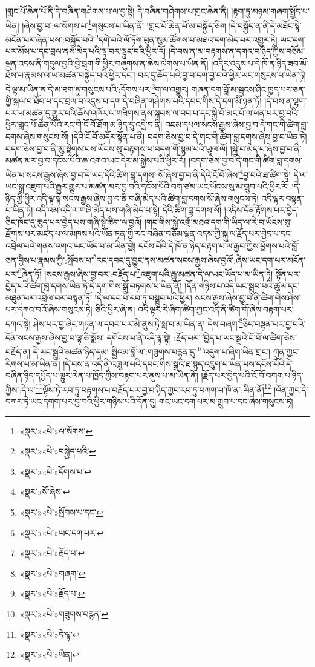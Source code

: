 །གླང་པོ་ཆེན་པོ་ནི་དེ་བཞིན་གཤེགས་པ་ལ་བྱ་སྟེ། དེ་བཞིན་གཤེགས་པ་གླང་ཆེན་ནི། །རྟག་ཏུ་མཉམ་གཞག་སྤྱོད་པ་ཡིན། །ཞེས་བྱ་བ་:ལ་སོགས་པ་\footnote{«སྣར་»«པེ་»ལ་སོགས་}གསུངས་པ་ཡིན་ནོ། །གླང་པོ་ཆེན་པོ་མ་བསྐྱོད་ཅིག །དེ་བསྐྱོད་ན་ནི་དེ་མཐོང་སྟེ་མངོན་པར་ཞེན་པས་:བསྐྱོད་པའི་\footnote{«སྣར་»«པེ་»བསྐྱེད་པའི་}དགེ་བའི་ལོ་ཏོག་ཕུན་སུམ་ཚོགས་པ་མཐའ་དག་མེད་པར་འགྱུར་ཏེ། ཡང་དག་པར་མོས་པ་དང་བྲལ་ནས་མེད་པའི་ལྟ་བར་ལྟུང་བའི་ཕྱིར་རོ། །དེ་བས་ན་མ་བརྟགས་ན་དགའ་བ་ཉིད་ཀྱིས་བཅོམ་ལྡན་འདས་ནི་གདུལ་བྱའི་བྱེ་བྲག་གི་ཕྱིར་བཞུགས་ན་ཆེས་ལེགས་པ་ཡིན་ནོ། །འདིར་འདུས་པ་དེ་ཁོ་ན་ཉིད་ཟབ་མོ་ཐོས་པ་རྣམས་ལ་ཡ་མཚན་བསྐྱེད་པའི་ཕྱིར་དང་། བར་དུ་ཆོད་པའི་བྱ་བ་དག་བྱ་བའི་ཕྱིར་ཡང་གསུངས་པ་ཡིན་ཏེ། དེ་ལྟ་མ་ཡིན་ན་དེ་མ་ཐག་ཏུ་གསུངས་པའི་:དོགས་པར་\footnote{«སྣར་»«པེ་»དོགས་པ་}ག་ལ་འགྱུར། གཞན་དག་བློ་མ་སྦྱངས་ཤིང་ཁྱད་པར་ཅན་གྱི་སྐལ་བ་ཐོབ་པ་དང་བྲལ་བ་འདུས་པ་དག་དེ་བཞིན་གཤེགས་པའི་དབང་གིས་དེ་དག་མི་ཉན་ཏོ། །དེ་བས་ན་ལྷག་པར་ཡ་མཚན་དུ་གྱུར་པའི་ཆོས་འཁོར་ལ་གཟིགས་ནས་སྐབས་ལ་བབ་པ་དང་སྐྱེ་བོ་མང་པོ་ལ་ཕན་པར་བྱ་བའི་ཕྱིར་གླང་པོ་ཆེན་པོའི་རང་གི་ངོ་བོ་ཐོག་མ་ཉིད་དུ་འདྲི་བ་ནི། འཇམ་དཔལ་སངས་རྒྱས་ཞེས་བྱ་བ་དེ་གང་གི་ཚིག་བླ་དགས་ཞེས་གསུངས་སོ། །དེའི་ངོ་བོ་མདོར་སྟོན་པ་ནི། བདག་ཅེས་བྱ་བ་དེ་གང་གི་ཚིག་བླ་དགས་ཞེས་བྱ་བ་ཡིན་ཏེ། བདག་ཅེས་བྱ་བ་ནི་མུ་སྟེགས་པས་ཡོངས་སུ་བརྟགས་པ་བདག་གོ་སྙམ་པའི་ཡུལ་ལོ། །སྐྱེ་བ་མེད་པ་ཞེས་བྱ་བ་ནི་མཚན་མར་བྱ་བ་དངོས་པོའི་ཆ་འགའ་ཡང་དེར་མ་སྐྱེས་པའི་ཕྱིར་རོ། །བདག་ཅེས་བྱ་བ་དེ་གང་གི་ཚིག་བླ་དགས་ཡིན་པ་སངས་རྒྱས་ཞེས་བྱ་བ་དེ་ཡང་དེའི་ཚིག་བླ་དགས་:སོ་ཞེས་བྱ་བ་ནི་དེའི་ངོ་བོ་ཞེས་\footnote{«སྣར་»སོ་ཞེས་}བྱ་བའི་ཐ་ཚིག་སྟེ། དེ་ལ་ཡང་སྒྲ་འཇུག་པའི་རྒྱུར་གྱུར་པ་མཚན་མར་བྱ་བའི་དངོས་པོའི་བག་ཙམ་ཡང་ཡོངས་སུ་མ་གྲུབ་པའི་ཕྱིར་རོ། །དེ་ཉིད་ཀྱི་ཕྱིར་འདི་ལྟ་སྟེ་སངས་རྒྱས་ཞེས་བྱ་བ་ནི་གཞི་མེད་པའི་ཚིག་བླ་དགས་སོ་ཞེས་གསུངས་ཏེ། འདི་ལྟར་བསྟན་པ་ཡིན་ཏེ། འདི་འམ་འདི་ལ་གཞི་མེད་པས་གཞི་མེད་པ་སྟེ། དེའི་ཚིག་བླ་དགས་སོ། །འདིས་དོན་རྟོགས་པར་བྱེད་ཅིང་ཁོང་དུ་ཆུད་པར་བྱེད་པས་གཞི་སྟེ་ཚིག་ལ་བྱའོ། །གང་གིས་སྐྱེ་འགྲོ་མཐའ་དག་གི་ཡིད་ལ་རེ་བ་ཡོངས་སུ་རྫོགས་པར་མཛད་པ་ལ་མཁས་པའི་ཡོན་ཏན་གྱི་རང་བཞིན་བཅོམ་ལྡན་འདས་ཀྱི་སྐུ་ལ་རྗོད་པར་བྱེད་པ་དང་འབྲེལ་པའི་གནས་འགའ་ཡང་ཡོད་པ་མ་ཡིན་གྱི། དངོས་པོའི་དེ་ཁོ་ན་ཉིད་བརྟག་པ་ལ་རྒྱབ་ཀྱིས་ཕྱོགས་པའི་བློ་ཅན་བྱིས་པ་རྣམས་ཀྱི་:སྤོབས་པ་\footnote{«སྣར་»«པེ་»སྤོབས་པ་དང་}རང་དབང་དུ་བྱུང་ནས་མཚན་སངས་རྒྱས་ཞེས་བྱའོ་:ཞེས་ཡང་དག་པར་མངོན་པར་\footnote{«སྣར་»«པེ་»ཡང་དག་པར་}ཞེན་ཏོ། །སངས་རྒྱས་ཞེས་བྱ་བར་:བརྗོད་པ་\footnote{«སྣར་»«པེ་»རྗོད་པ་}འཇུག་པའི་རྒྱུ་མཚན་དེ་ལ་ཡང་ཡོད་པ་མ་ཡིན་ཏེ། སྟོན་པར་བྱེད་པའི་ཚིག་བླ་དགས་ཡིན་ཏེ་དེ་དག་གིས་སྒྲོ་བཏགས་པ་ཡིན་ནོ། །དོན་གཉིས་པ་འདི་ཡང་སྒྲུབ་པའི་ཚུལ་དང་མཐུན་པར་འབྲེལ་བར་བསྟན་ཏོ། །དེ་ལ་དང་པོ་རབ་ཏུ་བསྒྲུབ་པའི་ཕྱིར། སངས་རྒྱས་ཞེས་བྱ་བ་ནི་ཚིག་གིས་ཤེས་པར་དཀའ་བའོ་ཞེས་གསུངས་ཏེ། ཅིའི་ཕྱིར་ཞེ་ན། འདི་ལྟར་རེ་ཞིག་ཚིག་ཀྱང་འདི་ནི་ཚིག་གོ་ཞེས་བརྟག་པར་དཀའ་སྟེ། ཤེས་པར་བྱ་ཞིང་གཏན་ལ་དབབ་པར་མི་ནུས་ཏེ་སླ་བ་མ་ཡིན་ན། དེས་བཞག་\footnote{«སྣར་»«པེ་»གཞག་}ཅིང་བསྟན་པར་བྱ་བའི་དོན་སངས་རྒྱས་ཞེས་བྱ་བ་ལྟ་ཅི་སྨོས། དགོངས་པ་ནི་འདི་ལྟ་སྟེ། :རྗོད་པར་\footnote{«སྣར་»«པེ་»རྗོད་པ་}བྱེད་པ་ཡང་སྒྲའི་ངོ་བོ་ལ་ཚིག་ཅེས་བརྗོད་ན། དེ་ཡང་སྒྲའི་མཚན་ཉིད་དམ། སྤྱིའམ་བློ་ལ་:གཟུགས་བརྙན་དུ་\footnote{«སྣར་»«པེ་»གཟུགས་བརྙན་}འདུག་པ་ཞིག་ཡིན་གྲང་། ཀུན་ཀྱང་རིགས་པ་མ་ཡིན་ནོ། །དེ་བས་ན་འདི་ནི་འཁྲུལ་པའི་དབང་གིས་སྒྲའི་ཐ་སྙད་འཇུག་པ་ཡིན་པས་དངོས་པོའི་དེ་བཞིན་ཉིད་དཔྱོད་པ་ལྷུར་ལེན་པ་ཁྱོད་ཀྱིས་བརྟག་པར་ནུས་པ་མ་ཡིན་ནོ། །རྗོད་པར་བྱེད་པའི་ངོ་བོ་བཀག་པ་ཉིད་ཀྱིས་:དེ་ལ་\footnote{«སྣར་»«པེ་»དེ་ལྟ་}ལྟོས་ཏེ་རབ་ཏུ་བརྟགས་པ་བརྗོད་པར་བྱ་བ་ཉིད་ཀྱང་རབ་ཏུ་བཀག་པ་ཁོ་ན་:ཡིན་ནོ།\footnote{«སྣར་»«པེ་»ཡིན།} །འོན་ཀྱང་དེ་བཀར་ཏེ་ཡང་དགག་པར་བྱ་བའི་ཕྱིར་གཉིས་པའི་དོན་དུ། གང་ཡང་དག་པར་མ་གྲུབ་པ་དང་ཞེས་གསུངས་ཏེ། 